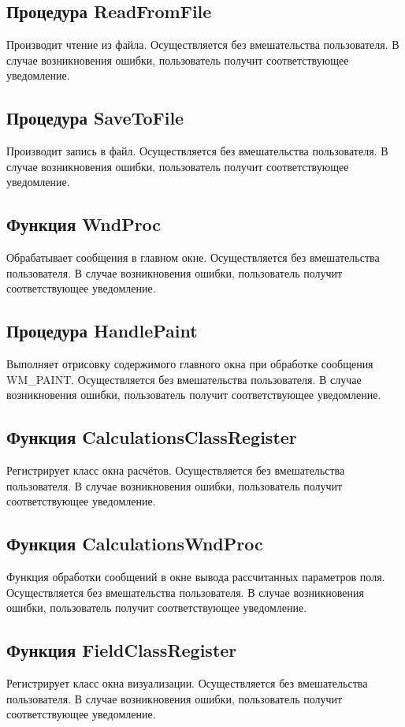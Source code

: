 \documentclass[14pt,a4paper,final]{extreport}
\begin{document}
\subsection{Процедура ReadFromFile}
Производит чтение из файла. Осуществляется без вмешательства пользователя. 
В случае возникновения ошибки, пользователь получит соответствующее уведомление.

\subsection{Процедура SaveToFile}
Производит запись в файл.  Осуществляется без вмешательства пользователя. 
В случае возникновения ошибки, пользователь получит соответствующее уведомление.

\subsection{Функция WndProc}
Обрабатывает сообщения в главном окне. Осуществляется без вмешательства пользователя. 
В случае возникновения ошибки, пользователь получит соответствующее уведомление.

\subsection{Процедура HandlePaint}
Выполняет отрисовку содержимого главного окна при обработке сообщения WM\_PAINT. Осуществляется без вмешательства пользователя. 
В случае возникновения ошибки, пользователь получит соответствующее уведомление.

\subsection{Функция CalculationsClassRegister}
Регистрирует класс окна расчётов. Осуществляется без вмешательства пользователя. 
В случае возникновения ошибки, пользователь получит соответствующее уведомление.

\subsection{Функция CalculationsWndProc}
Функция обработки сообщений в окне вывода рассчитанных параметров поля. Осуществляется без вмешательства пользователя. 
В случае возникновения ошибки, пользователь получит соответствующее уведомление.

\subsection{Функция FieldClassRegister}
Регистрирует класс окна визуализации. Осуществляется без вмешательства пользователя. 
В случае возникновения ошибки, пользователь получит соответствующее уведомление.
\end{document}
